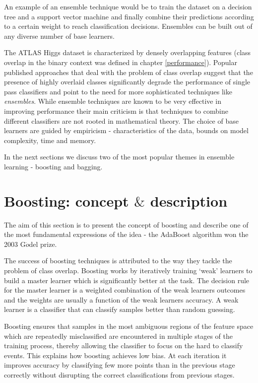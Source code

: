 An example of an ensemble technique would be to train the dataset on a decision tree and a support vector machine and finally combine their predictions according to a certain weight to reach classification decisions. Ensembles can be built out of any diverse number of base learners. 

The ATLAS Higgs dataset is characterized by densely overlapping features (class overlap in the binary context was defined in chapter \ref{performance}). Popular published approaches that deal with the problem of class overlap suggest that the presence of highly overlaid classes significantly degrade the performance of single pass classifiers and point to the need for more sophisticated techniques like \textit{ensembles}. While ensemble techniques are known to be very effective in improving performance their main criticism is that techniques to combine different classifiers are not rooted in mathematical theory. The choice of base learners are guided by empiricism - characteristics of the data, bounds on model complexity, time and memory.

In the next sections we discuss two of the most popular themes in ensemble learning - boosting and bagging.  

\section{Boosting: concept \texorpdfstring{$\&$}{} description}

The aim of this section is to present the concept of boosting and describe one of the most fundamental expressions of the idea - the AdaBoost algorithm \cite{scapire} won the 2003 G$\ddot{o}$del prize. 

The success of boosting techniques is attributed to the way they tackle the problem of class overlap. Boosting works by iteratively training `weak' learners to build a master learner which is significantly better at the task. The decision rule for the master learner is a weighted combination of the weak learners outcomes and the weights are usually a function of the weak learners accuracy. A weak learner is a classifier that can classify samples better than random guessing.

Boosting ensures that samples in the most ambiguous regions of the feature space which are repeatedly misclassified are encountered in multiple stages of the training process, thereby allowing the classifier to focus on the hard to classify events. This explains how boosting achieves low bias. At each iteration it improves accuracy by classifying few more points than in the previous stage correctly without disrupting the correct classifications from previous stages. 

